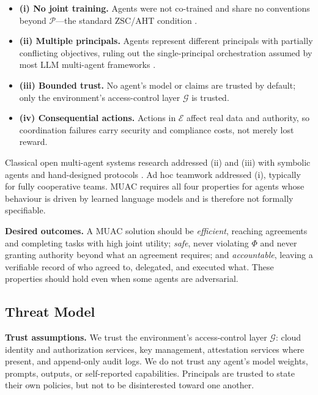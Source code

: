 \documentclass[conference]{IEEEtran}
\providecommand{\tightlist}{\setlength{\itemsep}{0pt}\setlength{\parskip}{0pt}}
\begin{document}
\begin{itemize}
\tightlist
\item
  \textbf{(i) No joint training.} Agents were not co-trained and share no conventions beyond \(\mathcal{P}\)---the standard ZSC/AHT condition \cite{stone2010adhoc, hu2020otherplay}.
\item
  \textbf{(ii) Multiple principals.} Agents represent different principals with partially conflicting objectives, ruling out the single-principal orchestration assumed by most LLM multi-agent frameworks \cite{wu2023autogen, hong2023metagpt, fourney2024magenticone}.
\item
  \textbf{(iii) Bounded trust.} No agent's model or claims are trusted by default; only the environment's access-control layer \(\mathcal{G}\) is trusted.
\item
  \textbf{(iv) Consequential actions.} Actions in \(\mathcal{E}\) affect real data and authority, so coordination failures carry security and compliance costs, not merely lost reward.
\end{itemize}

Classical open multi-agent systems research addressed (ii) and (iii) with symbolic agents and hand-designed protocols \cite{smith1980contractnet, fipa2002acl}. Ad hoc teamwork addressed (i), typically for fully cooperative teams. MUAC requires all four properties for agents whose behaviour is driven by learned language models and is therefore not formally specifiable.

\textbf{Desired outcomes.} A MUAC solution should be \emph{efficient}, reaching agreements and completing tasks with high joint utility; \emph{safe}, never violating \(\Phi\) and never granting authority beyond what an agreement requires; and \emph{accountable}, leaving a verifiable record of who agreed to, delegated, and executed what. These properties should hold even when some agents are adversarial.

\subsection{Threat Model}\label{sec-3-2}

\textbf{Trust assumptions.} We trust the environment's access-control layer \(\mathcal{G}\): cloud identity and authorization services, key management, attestation services where present, and append-only audit logs. We do not trust any agent's model weights, prompts, outputs, or self-reported capabilities. Principals are trusted to state their own policies, but not to be disinterested toward one another.
\end{document}
